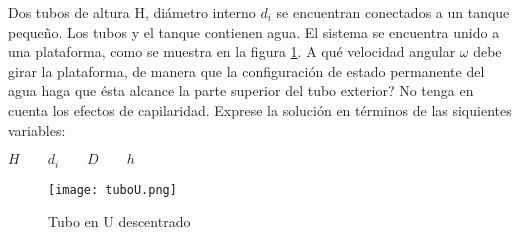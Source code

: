 \item Dos tubos de altura H, diámetro interno $d_i$ se encuentran conectados a un tanque pequeño. Los tubos y el tanque contienen agua. El sistema se encuentra unido a una plataforma, como se muestra en la figura \ref{fig:tuboU}. A qué velocidad angular $\omega$ debe girar la plataforma, de manera que la configuración de estado permanente del agua haga que ésta alcance la parte superior del tubo exterior? No tenga en cuenta los efectos de capilaridad. Exprese la solución en términos de las siquientes variables:

\begin{center}
$H \qquad d_i \qquad D \qquad h$
\end{center}

\begin{figure}[h!!!!]
\centering
\texttt{[image: tuboU.png]}
\caption{Tubo en U descentrado}
\label{fig:tuboU}
\end{figure}
